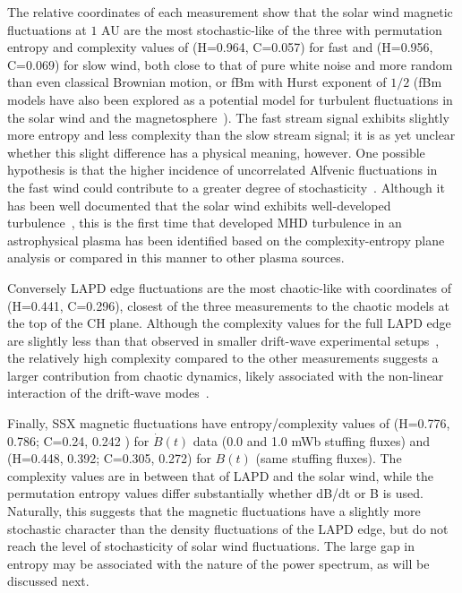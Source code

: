 \documentclass[aps,prx,twocolumn,secnumarabic,nobalancelastpage,amsmath,amssymb,
nofootinbib]{revtex4-1}
\begin{document}
The relative coordinates of each measurement show that the solar wind magnetic fluctuations at $1$ AU are the most stochastic-like of the three with permutation entropy and complexity values of (H=0.964, C=0.057) for fast and (H=0.956, C=0.069) for slow wind, both close to that of pure white noise and more random than even classical Brownian motion, or fBm with Hurst exponent of $1/2$ (fBm models have also been explored as a potential model for turbulent fluctuations in the solar wind and the magnetosphere~\cite{watkins2005}). The fast stream signal exhibits slightly more entropy and less complexity than the slow stream signal; it is as yet unclear whether this slight difference has a physical meaning, however. One possible hypothesis is that the higher incidence of uncorrelated Alfvenic fluctuations in the fast wind could contribute to a greater degree of stochasticity~\cite{orlando1997}. Although it has been well documented that the solar wind exhibits well-developed turbulence~\cite{bruno2013}, this is the first time that developed MHD turbulence in an astrophysical plasma has been identified based on the complexity-entropy plane analysis or compared in this manner to other plasma sources.

Conversely LAPD edge fluctuations are the most chaotic-like with coordinates of (H=0.441, C=0.296), closest of the three measurements to the chaotic models at the top of the CH plane. Although the complexity values for the full LAPD edge are slightly less than that observed in smaller drift-wave experimental setups~\cite{maggs2013}, the relatively high complexity compared to the other measurements suggests a larger contribution from chaotic dynamics, likely associated with the non-linear interaction of the drift-wave modes~\cite{maggs2012}. 

Finally, SSX magnetic fluctuations have entropy/complexity values of (H=0.776, 0.786; C=0.24, 0.242 ) for $\dot{B}(t)$ data (0.0 and 1.0 mWb stuffing fluxes) and (H=0.448, 0.392; C=0.305, 0.272) for $B(t)$ (same stuffing fluxes). The complexity values are in between that of LAPD and the solar wind, while the permutation entropy values differ substantially whether dB/dt or B is used. Naturally, this suggests that the magnetic fluctuations have a slightly more stochastic character than the density fluctuations of the LAPD edge, but do not reach the level of stochasticity of solar wind fluctuations. The large gap in entropy may be associated with the nature of the power spectrum, as will be discussed next.
\end{document}

